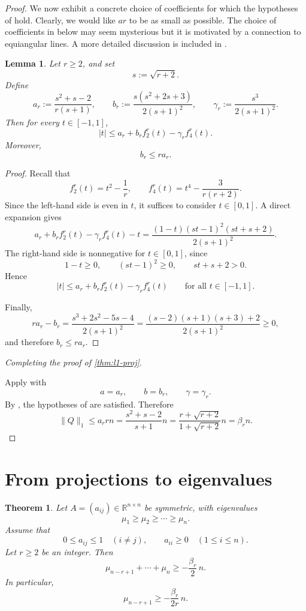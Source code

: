 \documentclass[12pt]{amsart}
\newtheorem{theorem}{Theorem}[section]
\newtheorem{lemma}[lemma]{Lemma}
\theoremstyle{myremark}
\newcommand{\R}{\mathbb{R}}
\newcommand{\1}{\mathbf{1}}
\begin{document}
\begin{proof}
We now exhibit a concrete choice of coefficients for which the hypotheses of  hold. Clearly, we would like $ar$ to be as small as possible. The choice of coefficients in  below may seem mysterious but it is motivated by a connection to equiangular lines. A more detailed discussion is included in . 


\begin{lemma}\label{lem:scalar-majorant}
Let \(r\ge 2\), and set
\[
s:=\sqrt{r+2}.
\]
Define
\[
a_r:=\frac{s^2+s-2}{r(s+1)},\qquad
b_r:=\frac{s(s^2+2s+3)}{2(s+1)^2},\qquad
\gamma_r:=\frac{s^3}{2(s+1)^2}.
\]
Then for every \(t\in[-1,1]\),
\[
|t|\le a_r+b_r f_2^r(t)-\gamma_r f_4^r(t).
\]
Moreover,
\[
b_r\le ra_r.
\]
\end{lemma}

\begin{proof}
Recall that
\[
f_2^r(t)=t^2-\frac1r,\qquad
f_4^r(t)=t^4-\frac{3}{r(r+2)}.
\]
Since the left-hand side is even in \(t\), it suffices to consider \(t\in[0,1]\).
A direct expansion gives
\[
a_r+b_r f_2^r(t)-\gamma_r f_4^r(t)-t
=
\frac{(1-t)(st-1)^2(st+s+2)}{2(s+1)^2}.
\]
The right-hand side is nonnegative for \(t\in[0,1]\), since
\[
1-t\ge 0,\qquad (st-1)^2\ge 0,\qquad st+s+2>0.
\]
Hence
\[
|t|\le a_r+b_r f_2^r(t)-\gamma_r f_4^r(t)
\qquad\text{for all } t\in[-1,1].
\]

Finally,
\[
ra_r-b_r
=
\frac{s^3+2s^2-5s-4}{2(s+1)^2}
=
\frac{(s-2)(s+1)(s+3)+2}{2(s+1)^2}\ge 0,
\]
and therefore \(b_r\le ra_r\).
\end{proof}



\noindent\textit{Completing the proof of \cref{thm:l1-proj}}.

Apply  with
\[
a=a_r,\qquad b=b_r,\qquad \gamma=\gamma_r.
\]
By , the hypotheses of  are satisfied. Therefore
\[
\|Q\|_1\le a_r r n = \frac{s^2 + s -2}{s+1} n = \frac{r+\sqrt{r+2}}{1+\sqrt{r+2}} n = \beta_r n.
\]

\end{proof}


\section{From projections to eigenvalues}

\begin{theorem}\label{thm:bottom-r}
Let $A=(a_{ij})\in \R^{n\times n}$ be symmetric, with eigenvalues
\[
\mu_1\ge \mu_2\ge \cdots\ge \mu_n.
\]
Assume that
\[
0\le a_{ij}\le 1 \quad (i\ne j),
\qquad
 a_{ii}\ge 0 \quad (1\le i\le n).
\]
Let $r\ge 2$ be an integer. Then
\[
\mu_{n-r+1}+\cdots+\mu_n\ge -\frac{\beta_r}{2}\,n.
\]
In particular,
\[
\mu_{n-r+1}\ge -\frac{\beta_r}{2r}\,n.
\]
\end{theorem}
\end{document}
